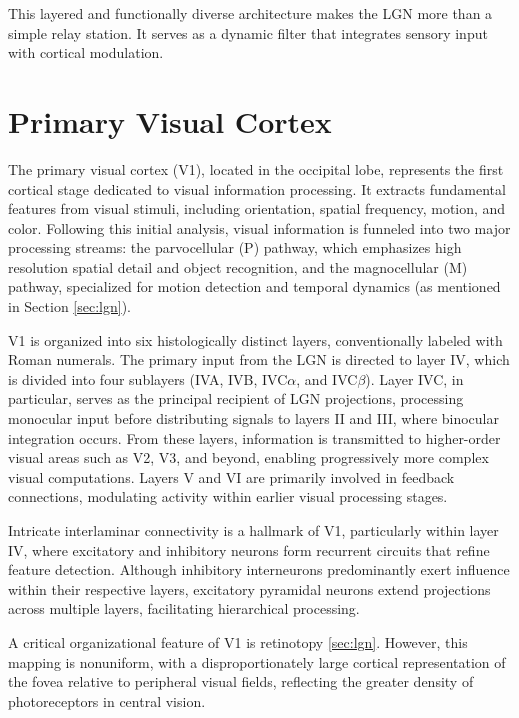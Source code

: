 This layered and functionally diverse architecture makes the LGN more than a simple relay station. It serves as a dynamic filter that integrates sensory input with cortical modulation.

\section{Primary Visual Cortex}
\label{sec:v1}

The primary visual cortex (V1), located in the occipital lobe, represents the first cortical stage dedicated to visual information processing. It extracts fundamental features from visual stimuli, including orientation, spatial frequency, motion, and color. Following this initial analysis, visual information is funneled into two major processing streams: the parvocellular (P) pathway, which emphasizes high resolution spatial detail and object recognition, and the magnocellular (M) pathway, specialized for motion detection and temporal dynamics (as mentioned in Section \ref{sec:lgn}).

V1 is organized into six histologically distinct layers, conventionally labeled with Roman numerals. The primary input from the LGN is directed to layer IV, which is divided into four sublayers (IVA, IVB, IVC$\alpha$, and IVC$\beta$). Layer IVC, in particular, serves as the principal recipient of LGN projections, processing monocular input before distributing signals to layers II and III, where binocular integration occurs. From these layers, information is transmitted to higher-order visual areas such as V2, V3, and beyond, enabling progressively more complex visual computations. Layers V and VI are primarily involved in feedback connections, modulating activity within earlier visual processing stages.

Intricate interlaminar connectivity is a hallmark of V1, particularly within layer IV, where excitatory and inhibitory neurons form recurrent circuits that refine feature detection. Although inhibitory interneurons predominantly exert influence within their respective layers, excitatory pyramidal neurons extend projections across multiple layers, facilitating hierarchical processing.

A critical organizational feature of V1 is retinotopy \ref{sec:lgn}. However, this mapping is nonuniform, with a disproportionately large cortical representation of the fovea relative to peripheral visual fields, reflecting the
greater density of photoreceptors in central vision. 

